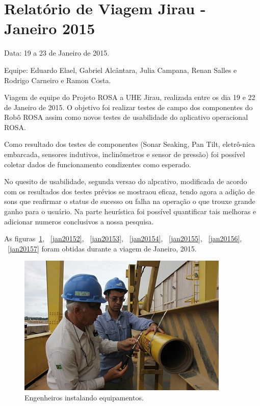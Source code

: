 \section{Relatório de Viagem Jirau - Janeiro 2015}
Data: 19 a 23 de Janeiro de 2015.

Equipe: Eduardo Elael, Gabriel Alcântara, Julia Campana, Renan Salles e Rodrigo Carneiro e Ramon Costa.

Viagem de equipe do Projeto ROSA a UHE Jirau, realizada entre
os dia 19 e 22 de Janeiro de 2015. O objetivo foi realizar testes de campo dos
componentes do Robô ROSA assim como novos testes de usabilidade do aplicativo
operacional ROSA.

Como resultado dos testes de componentes (Sonar Seaking, Pan Tilt, eletrô-\-nica
embarcada, sensores indutivos, inclinômetros e sensor de pressão) foi possível
coletar dados de funcionamento condizentes como esperado.

No quesito de usabilidade, segunda versao do alpcativo, modificada de acordo com
os resultados dos testes prévios se mostraou eficaz, tendo agora a adição de
sons que reafirmar o status de sucesso ou falha na operação o que trouxe grande
ganho para o usuário. Na parte heurística foi possível quantificar tais
melhoras e adicionar numeros conclusivos a nossa pesquisa.

As figuras~\ref{jan20151}, ~\ref{jan20152}, ~\ref{jan20153}, ~\ref{jan20154},
~\ref{jan20155}, ~\ref{jan20156}, ~\ref{jan20157} foram obtidas durante a viagem
de Janeiro, 2015.

\begin{figure}[h!]
\centering
  \includegraphics[width=1\linewidth]{Fotos/Janeiro2015/5.jpg}
  \caption{Engenheiros instalando equipamentos.}
  \label{jan20151}
\end{figure}


